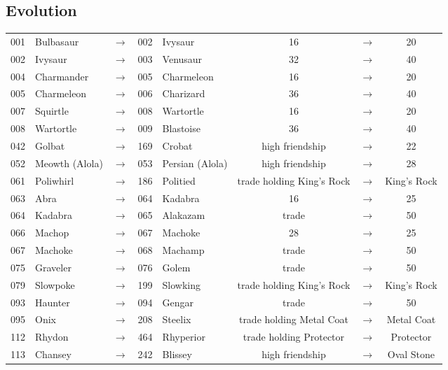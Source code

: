 \documentclass{article}
\begin{document}
\subsection{Evolution}
\small
\begin{longtable}{rlcrl|ccc}
\hline
001 & Bulbasaur & $\rightarrow$ & 002 & Ivysaur & 16 & $\rightarrow$ & 20 \\
002 & Ivysaur & $\rightarrow$ & 003 & Venusaur & 32 & $\rightarrow$ & 40 \\
004 & Charmander & $\rightarrow$ & 005 & Charmeleon & 16 & $\rightarrow$ & 20 \\
005 & Charmeleon & $\rightarrow$ & 006 & Charizard & 36 & $\rightarrow$ & 40 \\
007 & Squirtle & $\rightarrow$ & 008 & Wartortle & 16 & $\rightarrow$ & 20 \\
008 & Wartortle & $\rightarrow$ & 009 & Blastoise & 36 & $\rightarrow$ & 40 \\
042 & Golbat & $\rightarrow$ & 169 & Crobat & high friendship & $\rightarrow$ & 22 \\
052 & Meowth (Alola) & $\rightarrow$ & 053 & Persian (Alola) & high friendship & $\rightarrow$ & 28 \\
061 & Poliwhirl & $\rightarrow$ & 186 & Politied & trade holding King's Rock & $\rightarrow$ & King's Rock \\
063 & Abra & $\rightarrow$ & 064 & Kadabra & 16 & $\rightarrow$ & 25 \\
064 & Kadabra & $\rightarrow$ & 065 & Alakazam & trade & $\rightarrow$ & 50 \\
066 & Machop & $\rightarrow$ & 067 & Machoke & 28 & $\rightarrow$ & 25 \\
067 & Machoke & $\rightarrow$ & 068 & Machamp & trade & $\rightarrow$ & 50 \\
075 & Graveler & $\rightarrow$ & 076 & Golem & trade & $\rightarrow$ & 50 \\
079 & Slowpoke & $\rightarrow$ & 199 & Slowking & trade holding King's Rock & $\rightarrow$ & King's Rock \\
093 & Haunter & $\rightarrow$ & 094 & Gengar & trade & $\rightarrow$ & 50 \\
095 & Onix & $\rightarrow$ & 208 & Steelix & trade holding Metal Coat & $\rightarrow$ & Metal Coat \\
112 & Rhydon & $\rightarrow$ & 464 & Rhyperior & trade holding Protector & $\rightarrow$ & Protector \\
113 & Chansey & $\rightarrow$ & 242 & Blissey & high friendship & $\rightarrow$ & Oval Stone \\

\end{longtable}
\end{document}
